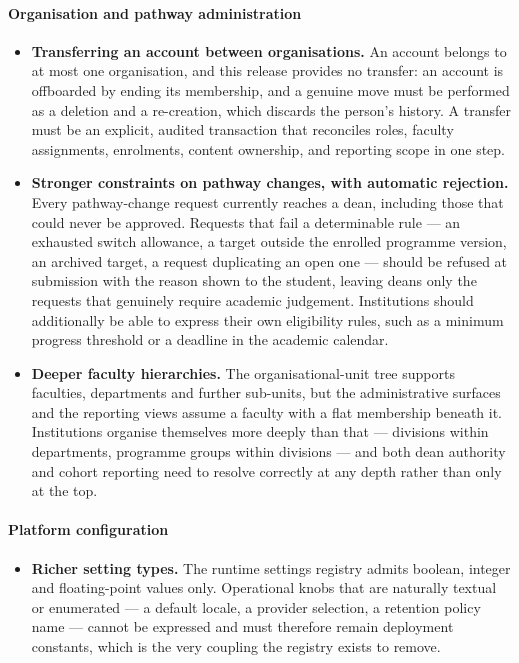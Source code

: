 \paragraph{Organisation and pathway administration}
\begin{itemize}
    \item \textbf{Transferring an account between organisations.} An account belongs to at most one organisation, and this release provides no transfer: an account is offboarded by ending its membership, and a genuine move must be performed as a deletion and a re-creation, which discards the person's history. A transfer must be an explicit, audited transaction that reconciles roles, faculty assignments, enrolments, content ownership, and reporting scope in one step.

    \item \textbf{Stronger constraints on pathway changes, with automatic rejection.} Every pathway-change request currently reaches a dean, including those that could never be approved. Requests that fail a determinable rule --- an exhausted switch allowance, a target outside the enrolled programme version, an archived target, a request duplicating an open one --- should be refused at submission with the reason shown to the student, leaving deans only the requests that genuinely require academic judgement. Institutions should additionally be able to express their own eligibility rules, such as a minimum progress threshold or a deadline in the academic calendar.

    \item \textbf{Deeper faculty hierarchies.} The organisational-unit tree supports faculties, departments and further sub-units, but the administrative surfaces and the reporting views assume a faculty with a flat membership beneath it. Institutions organise themselves more deeply than that --- divisions within departments, programme groups within divisions --- and both dean authority and cohort reporting need to resolve correctly at any depth rather than only at the top.
\end{itemize}

\paragraph{Platform configuration}
\begin{itemize}
    \item \textbf{Richer setting types.} The runtime settings registry admits boolean, integer and floating-point values only. Operational knobs that are naturally textual or enumerated --- a default locale, a provider selection, a retention policy name --- cannot be expressed and must therefore remain deployment constants, which is the very coupling the registry exists to remove.
\end{itemize}

